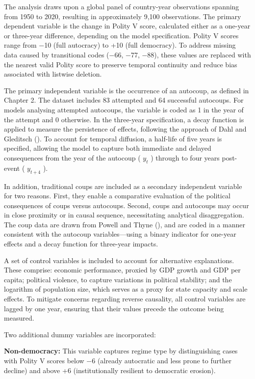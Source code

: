 \documentclass[
  12pt,
]{report}
\begin{document}
The analysis draws upon a global panel of country-year observations
spanning from 1950 to 2020, resulting in approximately 9,100
observations. The primary dependent variable is the change in Polity V
score, calculated either as a one-year or three-year difference,
depending on the model specification. Polity V scores range from −10
(full autocracy) to +10 (full democracy). To address missing data caused
by transitional codes (−66, −77, −88), these values are replaced with
the nearest valid Polity score to preserve temporal continuity and
reduce bias associated with listwise deletion.

The primary independent variable is the occurrence of an autocoup, as
defined in Chapter 2. The dataset includes 83 attempted and 64
successful autocoups. For models analysing attempted autocoups, the
variable is coded as 1 in the year of the attempt and 0 otherwise. In
the three-year specification, a decay function is applied to measure the
persistence of effects, following the approach of Dahl and Gleditsch
(). To account for temporal diffusion, a
half-life of five years is specified, allowing the model to capture both
immediate and delayed consequences from the year of the autocoup (
\(y_t\) ) through to four years post-event ( \(y_{t+4}\) ).

In addition, traditional coups are included as a secondary independent
variable for two reasons. First, they enable a comparative evaluation of
the political consequences of coups versus autocoups. Second, coups and
autocoups may occur in close proximity or in causal sequence,
necessitating analytical disaggregation. The coup data are drawn from
Powell and Thyne (), and are coded in a
manner consistent with the autocoup variables---using a binary indicator
for one-year effects and a decay function for three-year impacts.

A set of control variables is included to account for alternative
explanations. These comprise: economic performance, proxied by GDP
growth and GDP per capita; political violence, to capture variations in
political stability; and the logarithm of population size, which serves
as a proxy for state capacity and scale effects. To mitigate concerns
regarding reverse causality, all control variables are lagged by one
year, ensuring that their values precede the outcome being measured.

Two additional dummy variables are incorporated:

\textbf{Non-democracy:} This variable captures regime type by
distinguishing cases with Polity V scores below −6 (already autocratic
and less prone to further decline) and above +6 (institutionally
resilient to democratic erosion).
\end{document}
